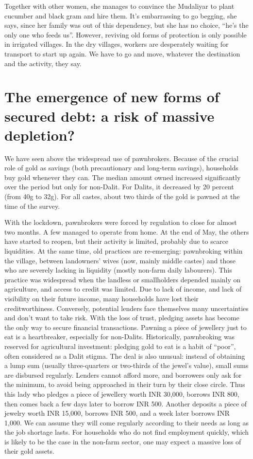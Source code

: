 \documentclass[a4paper, 11pt, onecolumn]{article}
\begin{document}
Together with other women, she manages to convince the Mudaliyar to plant cucumber and black gram and hire them. 
It's embarrassing to go begging, she says, since her family was out of this dependency, but she has no choice, ``he's the only one who feeds us''. 
However, reviving old forms of protection is only possible in irrigated villages. 
In the dry villages, workers are desperately waiting for transport to start up again. 
We have to go and move, whatever the destination and the activity, they say.  

\section{The emergence of new forms of secured debt: a risk of massive depletion?}
\label{section:newforms}

We have seen above the widespread use of pawnbrokers. 
Because of the crucial role of gold as savings (both precautionary and long-term savings), households buy gold whenever they can. 
The median amount owned increased significantly over the period but only for non-Dalit. 
For Dalits, it decreased by 20 percent (from 40g to 32g). 
For all castes, about two thirds of the gold is pawned at the time of the survey. 

With the lockdown, pawnbrokers were forced by regulation to close for almost two months. 
A few managed to operate from home. 
At the end of May, the others have started to reopen, but their activity is limited, probably due to scarce liquidities. 
At the same time, old practices are re-emerging: pawnbroking within the village, between landowners' wives (now, mainly middle castes) and those who are severely lacking in liquidity (mostly non-farm daily labourers). 
This practice was widespread when the landless or smallholders depended mainly on agriculture, and access to credit was limited. 
Due to lack of income, and lack of visibility on their future income, many households have lost their creditworthiness. 
Conversely, potential lenders face themselves many uncertainties and don’t want to take risk.  
With the loss of trust, pledging assets has become the only way to secure financial transactions. 
Pawning a piece of jewellery just to eat is a heartbreaker, especially for non-Dalits. 
Historically, pawnbroking was reserved for agricultural investment: pledging gold to eat is a habit of ``poor'', often considered as a Dalit stigma. 
The deal is also unusual: instead of obtaining a lump sum (usually three-quarters or two-thirds of the jewel’s value), small sums are disbursed regularly. 
Lenders cannot afford more, and borrowers only ask for the minimum, to avoid being approached in their turn by their close circle. 
Thus this lady who pledges a piece of jewellery worth INR 30,000, borrows INR 800, then comes back a few days later to borrow INR 500. 
Another deposits a piece of jewelry worth INR 15,000, borrows INR 500, and a week later borrows INR 1,000. 
We can assume they will come regularly according to their needs as long as the job shortage lasts. 
For households who do not find employment quickly, which is likely to be the case in the non-farm sector, one may expect a massive loss of their gold assets. 
\end{document}
